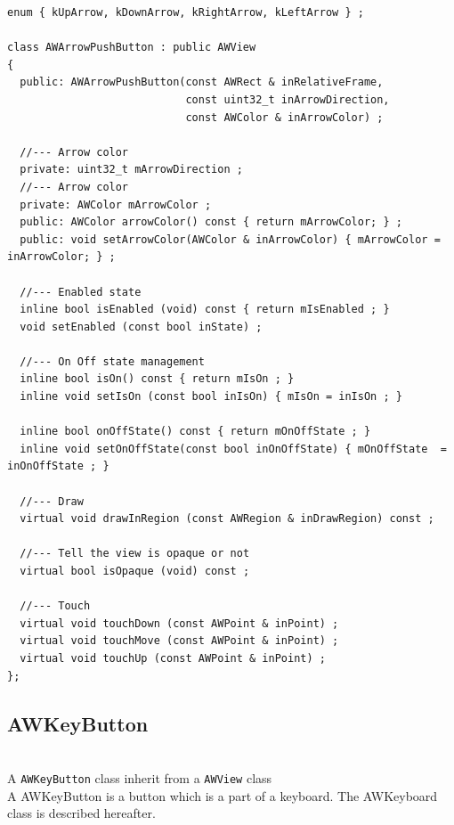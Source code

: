 \documentclass[a4paper,11pt]{extarticle}
\begin{document}
\begin{lstlisting}[language=Arduinonl]
enum { kUpArrow, kDownArrow, kRightArrow, kLeftArrow } ;

class AWArrowPushButton : public AWView
{
  public: AWArrowPushButton(const AWRect & inRelativeFrame,
                            const uint32_t inArrowDirection,
                            const AWColor & inArrowColor) ;

  //--- Arrow color
  private: uint32_t mArrowDirection ;
  //--- Arrow color
  private: AWColor mArrowColor ;
  public: AWColor arrowColor() const { return mArrowColor; } ;
  public: void setArrowColor(AWColor & inArrowColor) { mArrowColor = inArrowColor; } ;

  //--- Enabled state
  inline bool isEnabled (void) const { return mIsEnabled ; }
  void setEnabled (const bool inState) ;

  //--- On Off state management
  inline bool isOn() const { return mIsOn ; }
  inline void setIsOn (const bool inIsOn) { mIsOn = inIsOn ; }

  inline bool onOffState() const { return mOnOffState ; }
  inline void setOnOffState(const bool inOnOffState) { mOnOffState  = inOnOffState ; }

  //--- Draw
  virtual void drawInRegion (const AWRegion & inDrawRegion) const ;

  //--- Tell the view is opaque or not
  virtual bool isOpaque (void) const ;

  //--- Touch
  virtual void touchDown (const AWPoint & inPoint) ;
  virtual void touchMove (const AWPoint & inPoint) ;
  virtual void touchUp (const AWPoint & inPoint) ;
};
\end{lstlisting}


\newpage
\subsection{AWKeyButton}

~\\ A \texttt{AWKeyButton} class inherit from a \texttt{AWView} class
~\\ A AWKeyButton is a button which is a part of a keyboard. The AWKeyboard class is described hereafter.
~\\
~\\
\end{document}
